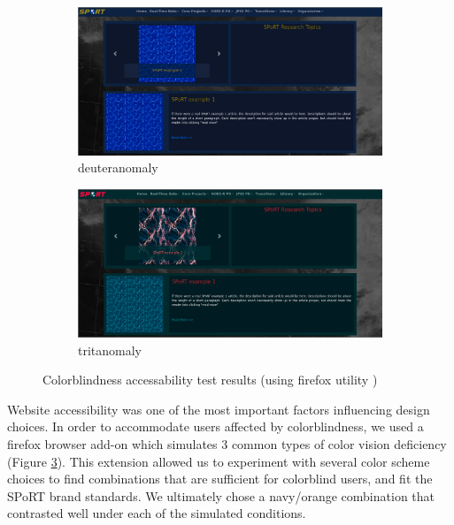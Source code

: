 \documentclass[12pt]{article}
\begin{document}
\begin{figure}
\centering
\begin{subfigure}{.5\textwidth}
  \centering
  \includegraphics[width=.98\linewidth]{./figures/acc-deuteranomaly}
  \caption{deuteranomaly}
  \label{acc-deuteranomaly} %
\end{subfigure}%
\begin{subfigure}{.5\textwidth}
  \centering
  \includegraphics[width=.98\linewidth]{./figures/acc-tritanomaly}
  \caption{tritanomaly}
  \label{acc-tritanomaly} %
\end{subfigure}
\caption{Colorblindness accessability test results (using firefox utility \cite{lgcb20})}
\label{colorblindness}
\end{figure}

Website accessibility was one of the most important factors influencing design choices. In order to accommodate users affected by colorblindness, we used a firefox browser add-on \cite{lgcb20} which simulates 3 common types of color vision deficiency (Figure \ref{colorblindness}). This extension allowed us to experiment with several color scheme choices to find combinations that are sufficient for colorblind users, and fit the SPoRT brand standards. We ultimately chose a navy/orange combination that contrasted well under each of the simulated conditions.
\end{document}
